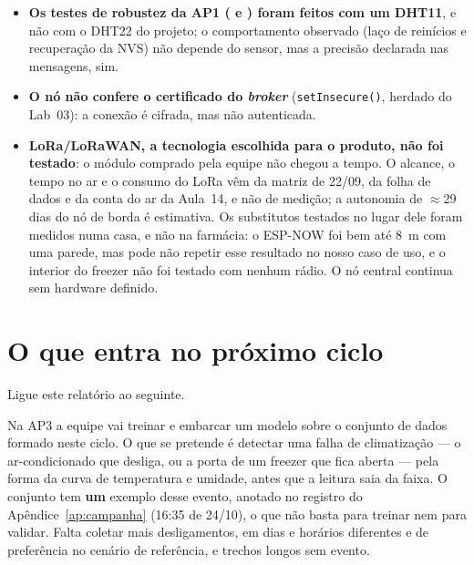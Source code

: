 \begin{itemize}
    de BLE, embora o RSSI mostre que as posições foram as mesmas
    (Apêndice~\ref{ap:testes}, ).
    Câmaras frias e freezers, cujas paredes metálicas devem atenuar muito
    mais, não foram testados.
  \item \textbf{Os testes de robustez da AP1 ( e ) foram
    feitos com um DHT11}, e não com o DHT22 do projeto; o comportamento
    observado (laço de reinícios e recuperação da NVS) não depende do
    sensor, mas a precisão declarada nas mensagens, sim.
  \item \textbf{O nó não confere o certificado do \emph{broker}}
    (\texttt{setInsecure()}, herdado do Lab~03): a conexão é cifrada, mas
    não autenticada.
  \item \textbf{LoRa/LoRaWAN, a tecnologia escolhida para o produto, não
    foi testado}: o módulo comprado pela equipe não chegou a tempo. O
    alcance, o tempo no ar e o consumo do LoRa vêm da matriz de 22/09, da
    folha de dados e da conta do ar da Aula~14, e não de medição; a
    autonomia de $\approx$29 dias do nó de borda é estimativa. Os
    substitutos testados no lugar dele foram medidos numa casa, e não na
    farmácia: o ESP-NOW foi bem até \SI{8}{\metre} com uma parede, mas
    pode não repetir esse resultado no nosso caso de uso, e o interior do
    freezer não foi testado com nenhum rádio. O nó central continua sem hardware
    definido.
\end{itemize}

\section{O que entra no próximo ciclo}

\begin{orientacao}
Ligue este relatório ao seguinte.
%
%
%
\end{orientacao}

Na AP3 a equipe vai treinar e embarcar um modelo sobre o conjunto de
dados formado neste ciclo. O que se pretende é detectar uma falha de
climatização --- o ar-condicionado que desliga, ou a porta de um
freezer que fica aberta --- pela forma da curva de temperatura e
umidade, antes que a leitura saia da faixa. O conjunto tem \textbf{um} exemplo desse evento, anotado no
registro do Apêndice~\ref{ap:campanha} (16:35 de 24/10), o que não
basta para treinar nem para validar. Falta coletar mais
desligamentos, em dias e horários diferentes e de preferência no
cenário de referência, e trechos longos sem evento.


